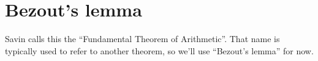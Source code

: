 \section{Bezout's lemma}

Savin calls this the ``Fundamental Theorem of Arithmetic''. That name
is typically used to refer to another theorem, so we'll use ``Bezout's
lemma'' for now.

